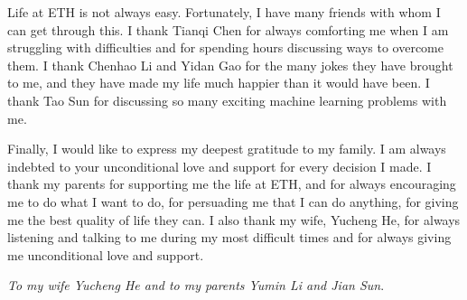 Life at ETH is not always easy. Fortunately, I have many friends with whom I can get through this. I thank Tianqi Chen for always comforting me when I am struggling with difficulties and for spending hours discussing ways to overcome them. I thank Chenhao Li and Yidan Gao for the many jokes they have brought to me, and they have made my life much happier than it would have been. I thank Tao Sun for discussing so many exciting machine learning  problems with me. 

Finally, I would like to express my deepest gratitude to my family. I am always indebted to your unconditional love and support for every decision I made. I thank my parents for supporting me the life at ETH, and for always encouraging me to do what I want to do, for persuading me that I can do anything, for giving me the best quality of life they can. I also thank my wife, Yucheng He, for always listening and talking to me during my most difficult times and for always giving me unconditional love and support.


{\centering
\textit{To my wife Yucheng He and to my parents Yumin Li and Jian Sun}}.

